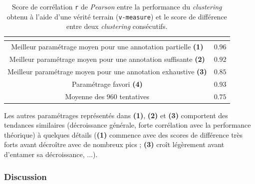			\begin{table}[!htb]
				\begin{center}
				\begin{tabular}{|c|r|}
				
					\hline
					\rowcolor{colorTableHeader!15}
					\multicolumn{1}{|c|}{\shortstack[c]{
						Paramétrage
					}}
						& \multicolumn{1}{c|}{\shortstack[c]{
							Corrélation
						}}
						\tabularnewline
						\hline \hline
					
					Meilleur paramétrage moyen pour une annotation partielle \textbf{(1)}
						& $0.96$
						\tabularnewline
						\hline
					
					Meilleur paramétrage moyen pour une annotation suffisante \textbf{(2)}
						& $0.92$
						\tabularnewline
						\hline
					
					Meilleur paramétrage moyen pour une annotation exhaustive \textbf{(3)}
						& $0.85$
						\tabularnewline
						\hline
					
					Paramétrage favori \textbf{(4)}
						& $0.93$
						\tabularnewline
						\hline
					
					Moyenne des $960$ tentatives
						& $0.75$
						\tabularnewline
						\hline
					
				\end{tabular}
				\end{center}
				\caption{
					Score de corrélation \texttt{r} de \textit{Pearson} entre la performance du \textit{clustering} obtenu à l'aide d'une vérité terrain (\texttt{v-measure}) et le score de différence entre deux \textit{clustering} consécutifs.
				}
				\label{table:4.5.2-ETUDE-RENTABILITE-CORRELATION-SIMILARITE-PERFORMANCE}
			\end{table}
			
			Les autres paramétrages représentés dans \textbf{(1)}, \textbf{(2)} et \textbf{(3)} comportent des tendances similaires (décroissance générale, forte corrélation avec la performance théorique) à quelques détails (\textbf{(1)} commence avec des scores de différence très forts avant décroître avec de nombreux pics ; \textbf{(3)} croît légèrement avant d'entamer sa décroissance, ...).
			
		\subsubsection{Discussion}
		
